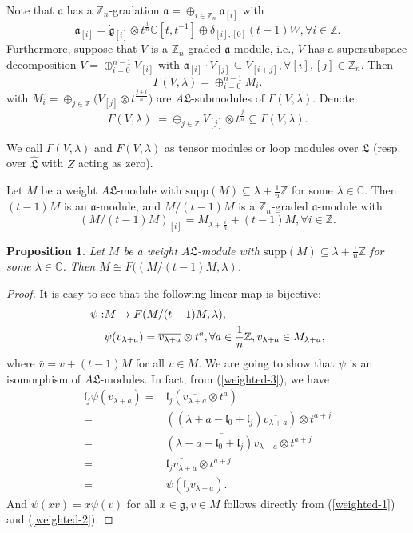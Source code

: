 \documentclass[1p]{elsarticle}
\numberwithin{equation}{section}
\def\dg{\dot{\mathfrak{g}}}
\def\fg{\mathfrak{g}}
\def\fL{\mathfrak{L}}
\def\ca{\mathfrak{a}}
\def\bC{\mathbb{C}}
\def\bZ{\mathbb{Z}}
\def\supp{\mathrm{supp}}
\def\fl{\mathfrak{l}}
\newtheorem{prop}[theo]{Proposition}
\begin{document}
Note that
 $\ca$ has a $\bZ_n$-gradation $\ca=\oplus_{i\in \bZ_n} \ca_{[i]}$ with $$\ca_{[i]}=\dg_{[i]}\otimes t^{\frac in}\bC[t,t^{-1}]\oplus \delta_{[i],[0]} (t-1)W,\forall i\in \bZ.$$ 
 Furthermore, suppose that $V$ is a $\bZ_n$-graded $\ca$-module, i.e., $V$ has a supersubspace decomposition $V=\oplus_{i=0}^{n-1} V_{[i]}$ with $\ca_{[i]}\cdot V_{[j]}\subseteq V_{[i+j]},\forall [i],[j]\in \bZ_n$. Then \begin{equation}\Gamma(V,\lambda)=\oplus_{i=0}^{n-1} M_{i}.\end{equation} 
 with $M_i=\oplus_{j\in \bZ} \big(V_{[j]}\otimes t^{\frac {j+i}n}\big)$ are $A\fL$-submodules of $\Gamma(V,\lambda)$. Denote \begin{equation}F(V,\lambda):=\oplus_{j\in \bZ} V_{[j]}\otimes t^{\frac {j}n}\subseteq \Gamma(V,\lambda).\end{equation}



 We call $\Gamma(V,\lambda)$ and $F(V,\lambda)$ as tensor modules or loop modules over $\fL$ (resp. over $\hat{\fL}$ with $Z$ acting as zero).







Let $M$ be a weight $A\fL$-module with  $\supp(M)\subseteq \lambda+\frac 1n \bZ$ for some $\lambda\in \bC$. Then $(t-1)M$ is an $\ca$-module, and $M/(t-1)M$ is a $\bZ_n$-graded $\ca$-module with $$(M/(t-1)M)_{[i]}=M_{\lambda+\frac in}+(t-1)M,\forall i\in \bZ.$$



\begin{prop}\label{prop-13}Let $M$ be a weight $A\fL$-module with  $\supp(M)\subseteq \lambda+\frac 1n \bZ$ for some $\lambda\in \bC$. Then $M\cong F((M/(t-1)M,\lambda)$. \end{prop}

\begin{proof}It is easy to see that the following linear map  is bijective:
	$$\aligned \psi: &M\rightarrow F(M/(t-1)M,\lambda),\\
	&\psi(v_{\lambda+a})=\overline{v_{\lambda+a}}\otimes t^{a},\forall a\in \frac 1n\bZ,v_{\lambda+a}\in M_{\lambda+a},\endaligned$$ where $\bar{v}=v+(t-1)M$ for all $v\in M$. We are going to show that $\psi$ is an isomorphism of $A\fL$-modules. In fact, from (\ref{weighted-3}), we have
	$$\begin{aligned}\fl_j \psi(v_{\lambda+a})=&\fl_j (\overline{v_{\lambda+a}}\otimes t^a)\\
		=&((\lambda+a-\fl_0+\fl_j)\overline{v_{\lambda+a}})\otimes t^{a+j}\\
		=&\overline{(\lambda+a-\fl_0+\fl_j)v_{\lambda+a}}\otimes t^{a+j}\\
		=&\overline{\fl_jv_{\lambda+a}}\otimes t^{a+j}\\
		=&\psi(\fl_jv_{\lambda+a}).\end{aligned}$$
And $\psi(x v)=x\psi(v)$ for all $x\in \fg,v\in M$ follows directly from (\ref{weighted-1}) and (\ref{weighted-2}). \end{proof}
\end{document}

